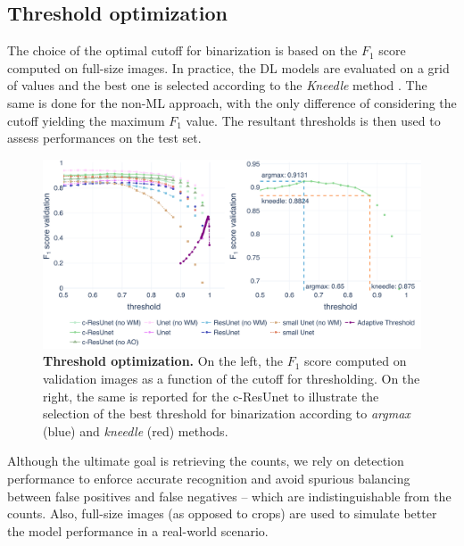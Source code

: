 \subsection{Threshold optimization}

The choice of the optimal cutoff for binarization is based on the $F_1$ score computed on full-size images. In practice, the DL models are evaluated on a grid of values and the best one is selected according to the \textit{Kneedle} method \cite{kneedle}. 
The same is done for the non-ML approach, with the only difference of considering the cutoff yielding the maximum $F_1$ value. 
The resultant thresholds is then used to assess performances on the test set.
\begin{figure}[h]
\centerline{
\includegraphics[width=\textwidth]{figures/130_methods/F1_optimization.pdf}
}
\caption{\textbf{Threshold optimization.} On the left, the $F_{1}$ score computed on validation images as a function of the cutoff for thresholding.
On the right, the same is reported for the c-ResUnet to illustrate the selection of the best threshold for binarization according to \textit{argmax} (blue) and \textit{kneedle} (red) methods.
} 
\label{fig:thresh_opt}
\end{figure}
Although the ultimate goal is retrieving the counts, we rely on detection performance to enforce accurate recognition and avoid spurious balancing between false positives and false negatives -- which are indistinguishable from the counts.
Also, full-size images (as opposed to crops) are used to simulate better the model performance in a real-world scenario.

